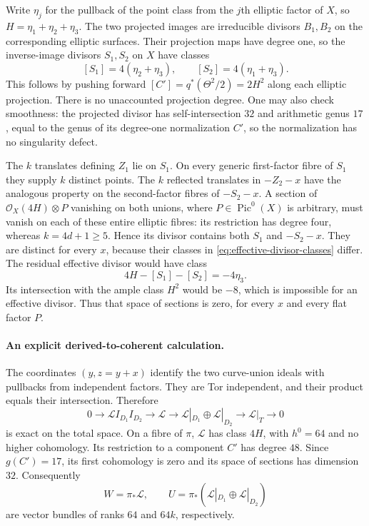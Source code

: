 Write $\eta_j$ for the pullback of the point class from the $j$th
elliptic factor of $X$, so $H=\eta_1+\eta_2+\eta_3$.
The two projected images are irreducible divisors $B_1,B_2$ on
the corresponding elliptic surfaces. Their projection maps have
degree one, so the inverse-image divisors $S_1,S_2$ on $X$
have classes
\begin{equation}\label{eq:effective-divisor-classes}
 [S_1]=4(\eta_2+\eta_3),\qquad
 [S_2]=4(\eta_1+\eta_3).                                  
\end{equation}
This follows by pushing forward
$[C']=q^*(\Theta^2/2)=2H^2$ along each elliptic projection.
There is no unaccounted projection degree. One may also check
smoothness: the projected divisor has self-intersection $32$ and
arithmetic genus $17$, equal to the genus of its degree-one
normalization $C'$, so the normalization has no singularity defect.

The $k$ translates defining $Z_1$ lie on $S_1$. On every generic
first-factor fibre of $S_1$ they supply $k$ distinct points.
The $k$ reflected translates in $-Z_2-x$ have the analogous
property on the second-factor fibres of $-S_2-x$. A section of
$\mathcal O_X(4H)\otimes P$ vanishing on both unions, where
$P\in\operatorname{Pic}^0(X)$ is arbitrary, must vanish on each
of these entire elliptic fibres: its restriction has degree four,
whereas $k=4d+1\ge5$. Hence its divisor contains both $S_1$ and
$-S_2-x$. They are distinct for every $x$, because their classes
in \eqref{eq:effective-divisor-classes} differ. The residual effective divisor would have class
\[
 4H-[S_1]-[S_2]=-4\eta_3.
\]
Its intersection with the ample class $H^2$ would be $-8$, which
is impossible for an effective divisor. Thus that space of
sections is zero, for every $x$ and every flat factor $P$.

\paragraph{An explicit derived-to-coherent calculation.}
The coordinates $(y,z=y+x)$ identify the two curve-union ideals
with pullbacks from independent factors. They are Tor independent,
and their product equals their intersection. Therefore
\begin{equation}\label{eq:effective-ideal-sequence}
 0\to\mathcal L I_{D_1}I_{D_2}\to\mathcal L
 \to\mathcal L|_{D_1}\oplus\mathcal L|_{D_2}
 \to\mathcal L|_T\to0                                    
\end{equation}
is exact on the total space.
On a fibre of $\pi$, $\mathcal L$ has class $4H$, with
$h^0=64$ and no higher cohomology. Its restriction to a component
$C'$ has degree $48$. Since $g(C')=17$, its first cohomology is zero
and its space of sections has dimension $32$. Consequently
\[
 W=\pi_*\mathcal L,\qquad
 U=\pi_*(\mathcal L|_{D_1}\oplus\mathcal L|_{D_2})
\]
are vector bundles of ranks $64$ and $64k$, respectively.

